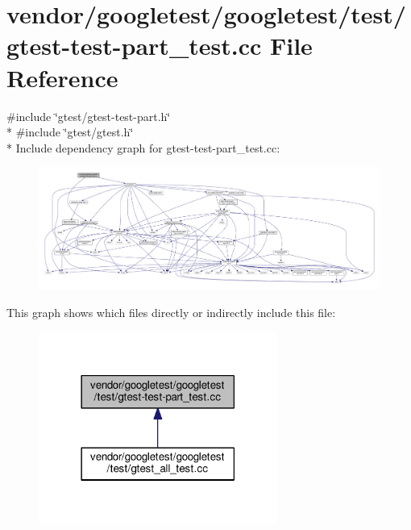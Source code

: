 \hypertarget{gtest-test-part__test_8cc}{}\section{vendor/googletest/googletest/test/gtest-\/test-\/part\+\_\+test.cc File Reference}
\label{gtest-test-part__test_8cc}
{\ttfamily \#include \char`\"{}gtest/gtest-\/test-\/part.\+h\char`\"{}}\\*
{\ttfamily \#include \char`\"{}gtest/gtest.\+h\char`\"{}}\\*
Include dependency graph for gtest-\/test-\/part\+\_\+test.cc\+:\nopagebreak
\begin{figure}[H]
\begin{center}
\leavevmode
\includegraphics[width=350pt]{gtest-test-part__test_8cc__incl}
\end{center}
\end{figure}
This graph shows which files directly or indirectly include this file\+:\nopagebreak
\begin{figure}[H]
\begin{center}
\leavevmode
\includegraphics[width=222pt]{gtest-test-part__test_8cc__dep__incl}
\end{center}
\end{figure}
